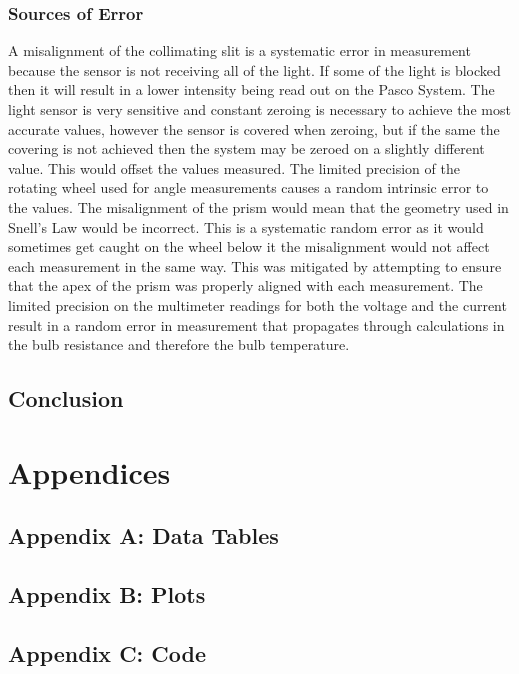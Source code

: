 \documentclass[a4paper]{article}
\begin{document}
\subsubsection{Sources of Error}

\qq A misalignment of the collimating slit is a systematic error in
measurement because the sensor is not receiving all of the light. If
some of the light is blocked then it will result in a lower intensity
being read out on the Pasco System. The light sensor is very sensitive
and constant zeroing is necessary to achieve the most accurate values,
however the sensor is covered when zeroing, but if the same the
covering is not achieved then the system may be zeroed on a slightly
different value. This would offset the values measured. The limited
precision of the rotating wheel used for angle measurements causes a
random intrinsic error to the values. The misalignment of the prism
would mean that the geometry used in Snell's Law would be
incorrect. This is a systematic random error as it would sometimes get
caught on the wheel below it the misalignment would not affect each
measurement in the same way. This was mitigated by attempting to
ensure that the apex of the prism was properly aligned with each
measurement. The limited precision on the multimeter readings for both
the voltage and the current result in a random error in measurement
that propagates through calculations in the bulb resistance and
therefore the bulb temperature.

\subsection{Conclusion}

\section{Appendices}

\subsection{Appendix A: Data Tables}

\subsection{Appendix B: Plots}
\label{app:stoppingPotentialPlots}

\subsection{Appendix C: Code}
\end{document}
